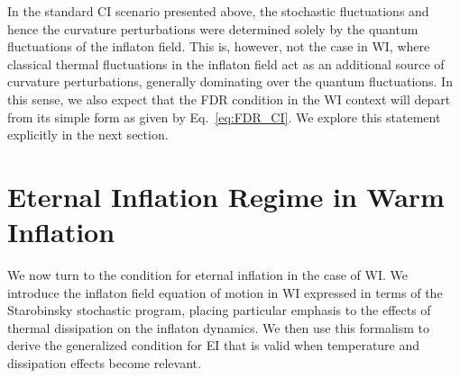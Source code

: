 \documentclass[a4paper,11pt]{article}
\begin{document}
In the standard CI scenario presented above, the stochastic fluctuations and hence the curvature perturbations were determined solely by the quantum fluctuations of the inflaton field. 
This is, however, not the case in WI, where classical thermal fluctuations in the inflaton field act as an additional source of
curvature perturbations, generally dominating over the quantum fluctuations. In this sense, we also expect that the FDR condition in
the WI context  will depart from its simple form as given by
Eq.~\eqref{eq:FDR_CI}.  We explore this statement explicitly in the next section. 


\section{Eternal Inflation Regime in Warm Inflation}
\label{EIWI}

We now turn to the condition for eternal inflation in the case of WI. We introduce the inflaton field equation of motion in WI expressed in terms of the Starobinsky stochastic program, placing particular emphasis to the effects of thermal dissipation on the inflaton dynamics. We then use this formalism to derive the generalized condition for EI that is valid when temperature and dissipation effects become relevant. 
\end{document}
